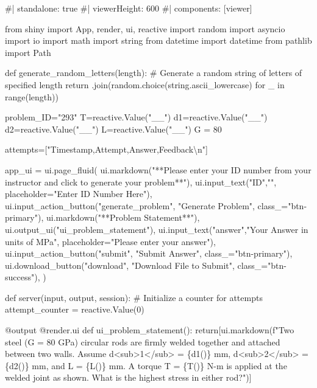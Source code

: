 \documentclass[
  letterpaper,
  DIV=11,
  numbers=noendperiod]{scrreprt}
\newenvironment{Shaded}{\begin{snugshade}}{\end{snugshade}}
\newcommand{\NormalTok}[1]{\textcolor[rgb]{0.00,0.23,0.31}{#1}}
\begin{document}
\begin{Shaded}
\begin{Highlighting}[]
\NormalTok{\#| standalone: true}
\NormalTok{\#| viewerHeight: 600}
\NormalTok{\#| components: [viewer]}

\NormalTok{from shiny import App, render, ui, reactive}
\NormalTok{import random}
\NormalTok{import asyncio}
\NormalTok{import io}
\NormalTok{import math}
\NormalTok{import string}
\NormalTok{from datetime import datetime}
\NormalTok{from pathlib import Path}

\NormalTok{def generate\_random\_letters(length):}
\NormalTok{    \# Generate a random string of letters of specified length}
\NormalTok{    return \textquotesingle{}\textquotesingle{}.join(random.choice(string.ascii\_lowercase) for \_ in range(length)) }

\NormalTok{problem\_ID="293"}
\NormalTok{T=reactive.Value("\_\_")}
\NormalTok{d1=reactive.Value("\_\_")}
\NormalTok{d2=reactive.Value("\_\_")}
\NormalTok{L=reactive.Value("\_\_")}
\NormalTok{G = 80}


\NormalTok{attempts=["Timestamp,Attempt,Answer,Feedback\textbackslash{}n"]}

\NormalTok{app\_ui = ui.page\_fluid(}
\NormalTok{    ui.markdown("**Please enter your ID number from your instructor and click to generate your problem**"),}
\NormalTok{    ui.input\_text("ID","", placeholder="Enter ID Number Here"),}
\NormalTok{    ui.input\_action\_button("generate\_problem", "Generate Problem", class\_="btn{-}primary"),}
\NormalTok{    ui.markdown("**Problem Statement**"),}
\NormalTok{    ui.output\_ui("ui\_problem\_statement"),}
\NormalTok{    ui.input\_text("answer","Your Answer in units of MPa", placeholder="Please enter your answer"),}
\NormalTok{    ui.input\_action\_button("submit", "Submit Answer", class\_="btn{-}primary"),}
\NormalTok{    ui.download\_button("download", "Download File to Submit", class\_="btn{-}success"),}
\NormalTok{)}


\NormalTok{def server(input, output, session):}
\NormalTok{    \# Initialize a counter for attempts}
\NormalTok{    attempt\_counter = reactive.Value(0)}

\NormalTok{    @output}
\NormalTok{    @render.ui}
\NormalTok{    def ui\_problem\_statement():}
\NormalTok{        return[ui.markdown(f"Two steel (G = 80 GPa) circular rods are firmly welded together and attached between two walls. Assume d\textless{}sub\textgreater{}1\textless{}/sub\textgreater{} = \{d1()\} mm, d\textless{}sub\textgreater{}2\textless{}/sub\textgreater{} = \{d2()\} mm, and L  = \{L()\} mm. A torque T = \{T()\} N{-}m is applied at the welded joint as shown. What is the highest stress in either rod?")]}
    

\end{Highlighting}
\end{Shaded}
\end{document}

